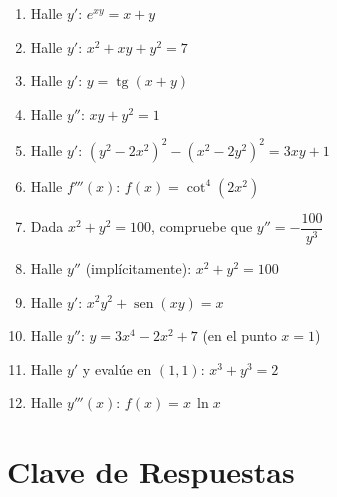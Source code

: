 \documentclass[12pt, letterpaper]{article}
\begin{document}
\begin{enumerate}[leftmargin=*]
  \item \dificil{} Halle $y'$: $e^{xy} = x + y$

  \item \dificil{} Halle $y'$: $x^2 + xy + y^2 = 7$

  \item \dificil{} Halle $y'$: $y = \operatorname{tg}(x + y)$

  \item \dificil{} Halle $y''$: $xy + y^2 = 1$

  \item \muyDificil{} Halle $y'$: $(y^2 - 2x^2)^2 - (x^2 - 2y^2)^2 = 3xy + 1$ %

  \item \muyDificil{} Halle $f'''(x)$: $f(x) = \cot^4(2x^2)$ %

  \item \muyDificil{} Dada $x^2 + y^2 = 100$, compruebe que $y'' = -\dfrac{100}{y^3}$ %

  \item \muyDificil{} Halle $y''$ (implícitamente): $x^2 + y^2 = 100$

  \item \muyDificil{} Halle $y'$: $x^2 y^2 + \operatorname{sen}(xy) = x$

  \item \muyDificil{} Halle $y''$: $y = 3x^4 - 2x^2 + 7$ (en el punto $x = 1$)

  \item \muyDificil{} Halle $y'$ y evalúe en $(1,1)$: $x^3 + y^3 = 2$

  \item \muyDificil{} Halle $y'''(x)$: $f(x) = x\,\ln x$

\end{enumerate}

\newpage
\ifmwclaves
  \section{Clave de Respuestas}
\end{document}
